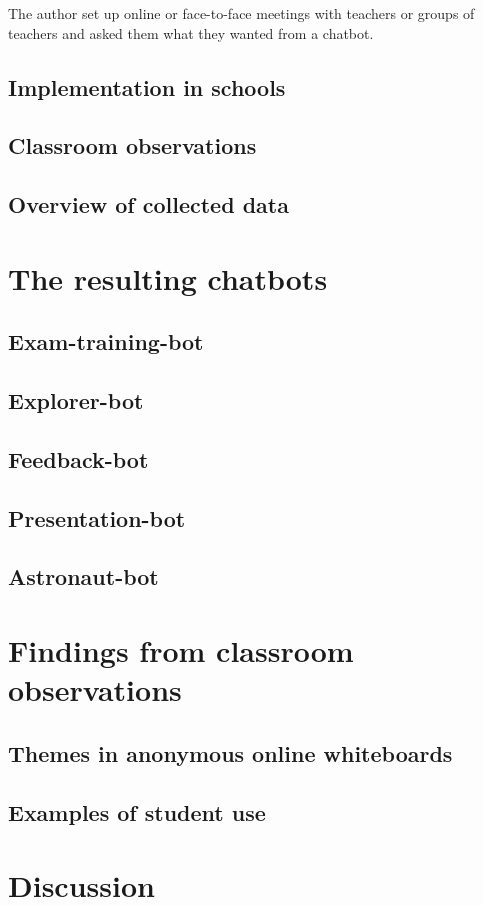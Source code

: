 \documentclass[pdflatex,sn-apa]{sn-jnl}%
\theoremstyle{thmstyleone}%
\theoremstyle{thmstyletwo}%
\theoremstyle{thmstylethree}%
\begin{document}
The author set up online or face-to-face meetings with teachers or groups of teachers and asked them what they wanted from a chatbot. 

\subsection{Implementation in schools}
\subsection{Classroom observations}
\subsection{Overview of collected data}

\section{The resulting chatbots}
\subsection{Exam-training-bot}
\subsection{Explorer-bot}
\subsection{Feedback-bot}
\subsection{Presentation-bot}
\subsection{Astronaut-bot}

\section{Findings from classroom observations}
\subsection{Themes in anonymous online whiteboards}
\subsection{Examples of student use}

\section{Discussion}
\end{document}

